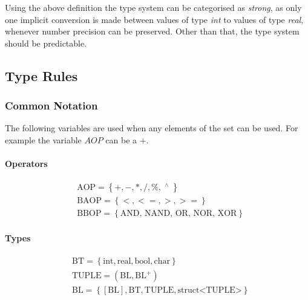 Using the above definition the type system can be categorised as \emph{strong}, as only one implicit conversion is made between values of type \emph{int} to values of type \emph{real}, whenever number precision can be preserved. Other than that, the type system should be predictable.



\subsection{Type Rules}

\newcommand{\Tpot}{^\wedge{}}
\newcommand{\Tint}{\text{int}}
\newcommand{\Treal}{\text{real}}
\newcommand{\Tbool}{\text{bool}}
\newcommand{\Tchar}{\text{char}}
\newcommand{\Tvoid}{\text{void}}
\newcommand{\Taop}{\text{AOP}}
\newcommand{\Tbaop}{\text{BAOP}}
\newcommand{\Tbbop}{\text{BBOP}}
\newcommand{\Tbl}{\text{BL}}
\newcommand{\Tbt}{\text{BT}}
\newcommand{\Tenv}{E \vdash}

\subsubsection{Common Notation}
The following variables are used when any elements of the set can be used. For example the variable $AOP$ can be a $+$.
\paragraph{Operators}
\begin{align*}
&\Taop = \left\{ {+, -, *, /, \%, \; \Tpot \;} \right\}
\\
&\Tbaop = \left\{ {<, <=, >, >=} \right\}
\\
&\Tbbop = \left\{ {\text{AND, NAND, OR, NOR, XOR}} \right\}
\end{align*}

\paragraph{Types}
\begin{align*}
&\Tbt = \left\{ {\Tint, \Treal, \Tbool, \Tchar} \right\}
\\
&\text{TUPLE} = (\Tbl, \Tbl^+)
\\            
&\Tbl = \left\{ { \left[ \Tbl \right], \Tbt, \text{TUPLE}, \text{struct<TUPLE>}} \right\}
\end{align*}

